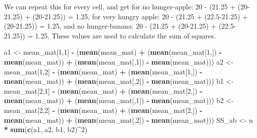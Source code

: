 \documentclass[]{book}
\newenvironment{Shaded}{\begin{snugshade}}{\end{snugshade}}
\newcommand{\DecValTok}[1]{\textcolor[rgb]{0.00,0.00,0.81}{#1}}
\newcommand{\KeywordTok}[1]{\textcolor[rgb]{0.13,0.29,0.53}{\textbf{#1}}}
\newcommand{\NormalTok}[1]{#1}
\newcommand{\OperatorTok}[1]{\textcolor[rgb]{0.81,0.36,0.00}{\textbf{#1}}}
\newcommand{\StringTok}[1]{\textcolor[rgb]{0.31,0.60,0.02}{#1}}
\begin{document}
We can repeat this for every cell, and get for no hunger-apple: 20 - (21.25 + (20-21.25) + (20-21.25)) = 1.25, for very hungry apple: 20 - (21.25 + (22.5-21.25) + (20-21.25)) = 1.25, and no hunger-banana: 20 - (21.25 + (20-21.25) + (22.5-21.25)) = 1.25. These values are used to calculate the sum of squares.

\begin{Shaded}
\begin{Highlighting}[]
\NormalTok{a1 <-}\StringTok{ }\NormalTok{mean_mat[}\DecValTok{1}\NormalTok{,}\DecValTok{1}\NormalTok{] }\OperatorTok{-}\StringTok{ }\NormalTok{(}\KeywordTok{mean}\NormalTok{(mean_mat) }\OperatorTok{+}\StringTok{ }\NormalTok{(}\KeywordTok{mean}\NormalTok{(mean_mat[}\DecValTok{1}\NormalTok{,]) }\OperatorTok{-}\StringTok{ }\KeywordTok{mean}\NormalTok{(mean_mat)) }\OperatorTok{+}\StringTok{ }\NormalTok{(}\KeywordTok{mean}\NormalTok{(mean_mat[,}\DecValTok{1}\NormalTok{]) }\OperatorTok{-}\StringTok{ }\KeywordTok{mean}\NormalTok{(mean_mat)))}
\NormalTok{a2 <-}\StringTok{ }\NormalTok{mean_mat[}\DecValTok{1}\NormalTok{,}\DecValTok{2}\NormalTok{] }\OperatorTok{-}\StringTok{ }\NormalTok{(}\KeywordTok{mean}\NormalTok{(mean_mat) }\OperatorTok{+}\StringTok{ }\NormalTok{(}\KeywordTok{mean}\NormalTok{(mean_mat[}\DecValTok{1}\NormalTok{,]) }\OperatorTok{-}\StringTok{ }\KeywordTok{mean}\NormalTok{(mean_mat)) }\OperatorTok{+}\StringTok{ }\NormalTok{(}\KeywordTok{mean}\NormalTok{(mean_mat[,}\DecValTok{2}\NormalTok{]) }\OperatorTok{-}\StringTok{ }\KeywordTok{mean}\NormalTok{(mean_mat)))}
\NormalTok{b1 <-}\StringTok{ }\NormalTok{mean_mat[}\DecValTok{2}\NormalTok{,}\DecValTok{1}\NormalTok{] }\OperatorTok{-}\StringTok{ }\NormalTok{(}\KeywordTok{mean}\NormalTok{(mean_mat) }\OperatorTok{+}\StringTok{ }\NormalTok{(}\KeywordTok{mean}\NormalTok{(mean_mat[}\DecValTok{2}\NormalTok{,]) }\OperatorTok{-}\StringTok{ }\KeywordTok{mean}\NormalTok{(mean_mat)) }\OperatorTok{+}\StringTok{ }\NormalTok{(}\KeywordTok{mean}\NormalTok{(mean_mat[,}\DecValTok{1}\NormalTok{]) }\OperatorTok{-}\StringTok{ }\KeywordTok{mean}\NormalTok{(mean_mat)))}
\NormalTok{b2 <-}\StringTok{ }\NormalTok{mean_mat[}\DecValTok{2}\NormalTok{,}\DecValTok{2}\NormalTok{] }\OperatorTok{-}\StringTok{ }\NormalTok{(}\KeywordTok{mean}\NormalTok{(mean_mat) }\OperatorTok{+}\StringTok{ }\NormalTok{(}\KeywordTok{mean}\NormalTok{(mean_mat[}\DecValTok{2}\NormalTok{,]) }\OperatorTok{-}\StringTok{ }\KeywordTok{mean}\NormalTok{(mean_mat)) }\OperatorTok{+}\StringTok{ }\NormalTok{(}\KeywordTok{mean}\NormalTok{(mean_mat[,}\DecValTok{2}\NormalTok{]) }\OperatorTok{-}\StringTok{ }\KeywordTok{mean}\NormalTok{(mean_mat)))}
\NormalTok{SS_ab <-}\StringTok{ }\NormalTok{n }\OperatorTok{*}\StringTok{ }\KeywordTok{sum}\NormalTok{(}\KeywordTok{c}\NormalTok{(a1, a2, b1, b2)}\OperatorTok{^}\DecValTok{2}\NormalTok{)}
\end{Highlighting}
\end{Shaded}
\end{document}
